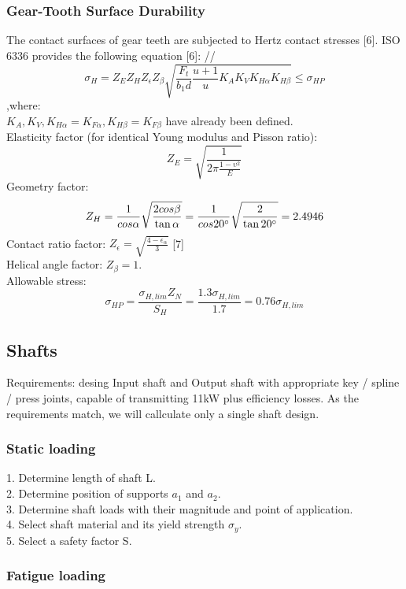 \documentclass{article}
\begin{document}
\subsubsection{Gear-Tooth Surface Durability}
The contact surfaces of gear teeth are subjected to Hertz contact stresses [6].
ISO 6336 provides the following equation [6]: //
\begin{equation}\sigma_H = Z_E Z_H Z_\epsilon Z_\beta \sqrt{\frac{F_t}{b_1 d}\frac{u + 1}{u} K_A K_V K_{H\alpha} K_{H\beta}} \leq \sigma_{HP} \end{equation}
,where: \\
$K_A, K_V, K_{H\alpha} = K_{F\alpha}, K_{H\beta} = K_{F\beta}$ have already been defined. \\
Elasticity factor (for identical Young modulus and Pisson ratio):
$$Z_E = \sqrt{\frac{1}{2 \pi \frac{1 - \upsilon^2}{E}}}$$
Geometry factor:
$$ Z_H = \frac{1}{cos \alpha}\sqrt{\frac{2 cos \beta}{\tan \alpha}} =  \frac{1}{cos 20 \degree}\sqrt{\frac{2}{\tan 20 \degree}} = 2.4946$$
Contact ratio factor: $Z_\epsilon = \sqrt{\frac{4 - \epsilon_\alpha}{3}}$ [7]\\
Helical angle factor: $Z_\beta = 1$. \\
Allowable stress:
$$ \sigma_{HP} = \frac{\sigma_{H, lim} Z_N}{S_H} =  \frac{1.3 \sigma_{H, lim}}{1.7} = 0.76\sigma_{H, lim} $$

\subsection{Shafts}
Requirements: desing Input shaft and Output shaft with appropriate key / spline / press  joints, capable of transmitting 11kW plus efficiency losses.
As the requirements match, we will callculate only a single shaft design.
\subsubsection{Static loading}
1. Determine length of shaft L. \\
2. Determine position of supports $a_1$ and $a_2$. \\
3. Determine shaft loads with their magnitude and point of application. \\
4. Select shaft material and its yield strength $\sigma_y$. \\
5. Select a safety factor S. \\
\subsubsection{Fatigue loading}
\end{document}
